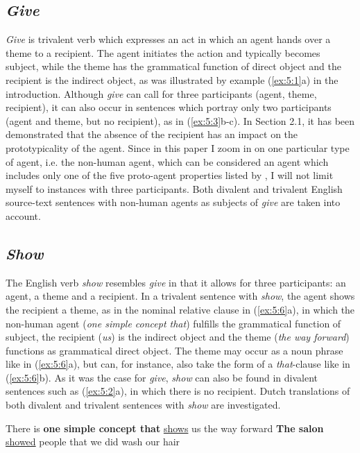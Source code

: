 \documentclass[output=paper]{LSP/langsci}
\begin{document}
\subsection{\textit{Give}}

\textit{Give} is trivalent verb which expresses an act in which an agent hands over a theme to a recipient. The agent initiates the action and typically becomes subject, while the theme has the grammatical function of direct object and the recipient is the indirect object, as was illustrated by example (\ref{ex:5:1}a) in the introduction. Although \textit{give} can call for three participants (agent, theme, recipient), it can also occur in sentences which portray only two participants (agent and theme, but no recipient), as in (\ref{ex:5:3}b-c). In Section 2.1, it has been demonstrated that the absence of the recipient has an impact on the prototypicality of the agent. Since in this paper I zoom in on one particular type of agent, i.e. the non-human agent, which can be considered an agent which includes only one of  the five proto-agent properties listed by \citet{Dowty1991}, I will not limit myself to instances with three participants. Both divalent and trivalent English source-text sentences with non-human agents as subjects of \textit{give} are taken into account.

\subsection{\textit{Show}}

The English verb \textit{show} resembles \textit{give} in that it allows for three participants: an agent, a theme and a recipient. In a trivalent sentence with \textit{show}, the agent shows the recipient a theme, as in the nominal relative clause in (\ref{ex:5:6}a), in which the non-human agent (\textit{one simple concept that}) fulfills the grammatical function of subject, the recipient (\textit{us}) is the indirect object and the theme (\textit{the way forward}) functions as grammatical direct object. The theme may occur as a noun phrase like in (\ref{ex:5:6}a), but can, for instance, also take the form of a \textit{that}-clause like in (\ref{ex:5:6}b). As it was the case for \textit{give}, \textit{show} can also be found in divalent sentences such as (\ref{ex:5:2}a), in which there is no recipient. Dutch translations of both divalent and trivalent sentences with \textit{show} are investigated.

\ea \label{ex:5:6}
\ea There is \textbf{one simple concept that} \ul{shows} us the way forward
\ex \textbf{The salon} \ul{showed} people that we did wash our hair
\z
\z
\end{document}
